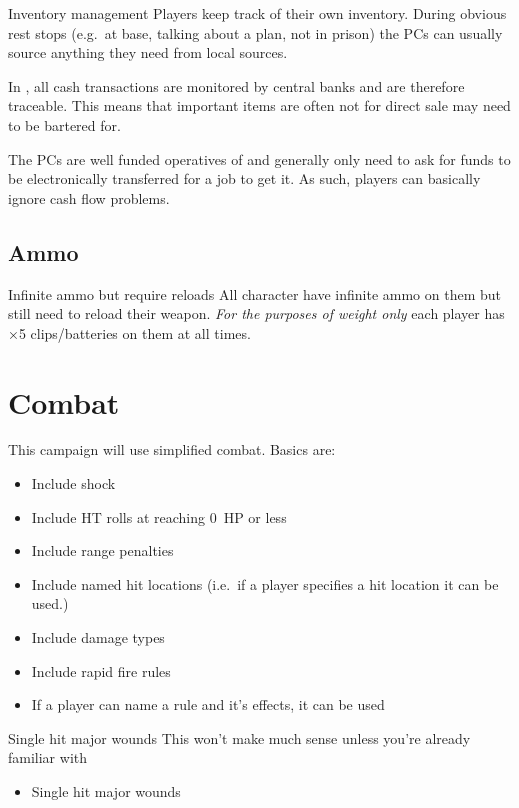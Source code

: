 \begin{proposal}{Inventory management}
  Players keep track of their own inventory. During obvious rest stops (e.g.~at
  base, talking about a plan, not in prison) the PCs can usually source anything
  they need from local sources.

  In , all cash transactions are monitored by central banks and are
  therefore traceable. This means that important items are often not for direct
  sale may need to be bartered for.

  \begin{tcolorbox}[title={What about cash?}]
    The PCs are well funded operatives of \thecompany and generally only need to
    ask for funds to be electronically transferred for a job to get it. As such,
    players can basically ignore cash flow problems.
  \end{tcolorbox}
\end{proposal}



\subsection{Ammo}
\label{sec:ammo}

\begin{proposal}{Infinite ammo but require reloads}
  All character have infinite ammo on them but still need to reload their
  weapon. \emph{For the purposes of weight only} each player has ×5
  clips/batteries on them at all times.
\end{proposal}


\section{Combat}
\label{sec:combat}

This campaign will use simplified \gurps combat. Basics are:

\begin{itemize}
\item Include shock
\item Include HT rolls at reaching 0~HP or less
\item Include range penalties
\item Include named hit locations (i.e.~if a player specifies a hit location it
  can be used.)
\item Include damage types
\item Include rapid fire rules
\item If a player can name a rule and it's effects, it can be used
\end{itemize}

\begin{proposal}{Single hit major wounds}
  This won't make much sense unless you're already familiar with \gurps
  \begin{itemize}
  \item Single hit major wounds
  \end{itemize}
\end{proposal}

